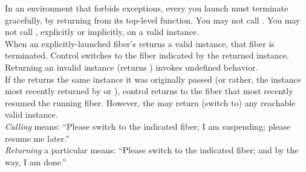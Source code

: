 In an environment that forbids exceptions, every \fiber you launch must
terminate gracefully, by returning from its top-level function. You may not
call \unwindfib. You may not call \dtor, explicitly or implicitly, on a
valid \fiber instance.\\

When an explicitly-launched fiber's \entryfn\xspace returns a valid \fiber
instance, that fiber is terminated. Control switches to the fiber indicated by
the returned \fiber instance.\\

Returning an invalid \fiber instance (\opbool returns ) invokes
undefined behavior.\\

If the \entryfn\xspace returns the same \fiber instance it was originally
passed (or rather, the \fiber instance most recently returned by \resume
or \resumewith), control returns to the fiber that most recently resumed the
running fiber. However, the \entryfn\xspace may return (switch to) any
reachable valid \fiber instance.\\

\emph{Calling} \resume means: ``Please switch to the indicated fiber; I
am suspending; please resume me later.''\\

\emph{Returning} a particular \fiber means: ``Please switch to the indicated
fiber; and by the way, I am done.''
